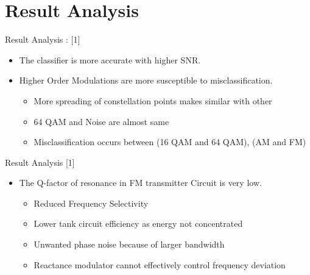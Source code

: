 \section{Result Analysis}

\begin{frame}[c]{Result Analysis : [1]}
    \begin{itemize}
        \item The classifier is more accurate with higher SNR. \vfill

        \item Higher Order Modulations are more susceptible to misclassification. \vfill
            \begin{itemize}
            \item More spreading of constellation points makes similar with other \vfill
            \item 64 QAM and Noise are almost same \vfill
            \item Misclassification occurs between (16 QAM and 64 QAM), (AM and FM)\vfill
            \end{itemize}
    \end{itemize}
\end{frame}



\begin{frame}{Result Analysis [1]}
    \begin{itemize}
        \item The Q-factor of resonance in FM transmitter Circuit is very low. \vfill
            \begin{itemize}
                \item Reduced Frequency Selectivity \vfill
                \item Lower tank circuit efficiency as energy not concentrated \vfill
                \item Unwanted phase noise because of larger bandwidth \vfill
                \item Reactance modulator cannot effectively control frequency deviation \vfill
            \end{itemize}
    \end{itemize}
\end{frame}